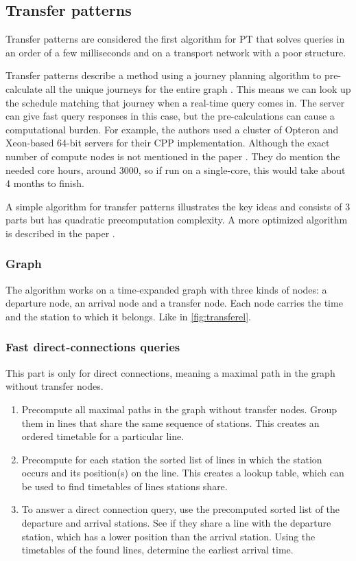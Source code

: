 \subsection{Transfer patterns}
Transfer patterns are considered the first algorithm for PT that solves queries in an order of a few milliseconds and on a transport network with a poor structure. 

Transfer patterns describe a method using a journey planning algorithm to pre-calculate all the unique journeys for the entire graph \cite{bast_fast_2010} %
. This means we can look up the schedule matching that journey when a real-time query comes in. The server can give fast query responses in this case, but the pre-calculations can cause a computational burden. For example, the authors used a cluster of Opteron and Xeon-based 64-bit servers for their CPP implementation. Although the exact number of compute nodes is not mentioned in the paper \cite{bast_fast_2010}. They do mention the needed core hours, around 3000, so if run on a single-core, this would take about 4 months to finish.  

A simple algorithm for transfer patterns illustrates the key ideas and consists of 3 parts but has quadratic precomputation complexity. A more optimized algorithm is described in the paper \cite{bast_fast_2010}.
\subsubsection{Graph}
The algorithm works on a time-expanded graph with three kinds of nodes: a departure node, an arrival node and a transfer node. Each node carries the time and the station to which it belongs. Like in \autoref{fig:transferel}.

\subsubsection{Fast direct-connections queries}
This part is only for direct connections, meaning a maximal path in the graph without transfer nodes.

\begin{enumerate}
    \item Precompute all maximal paths in the graph without transfer nodes. Group them in lines that share the same sequence of stations. This creates an ordered timetable for a particular line.
    \item Precompute for each station the sorted list of lines in which the station occurs and its position(s) on the line. This creates a lookup table, which can be used to find timetables of lines stations share.
    \item To answer a direct connection query, use the precomputed sorted list of the departure and arrival stations. See if they share a line with the departure station, which has a lower position than the arrival station. Using the timetables of the found lines, determine the earliest arrival time.
\end{enumerate}
